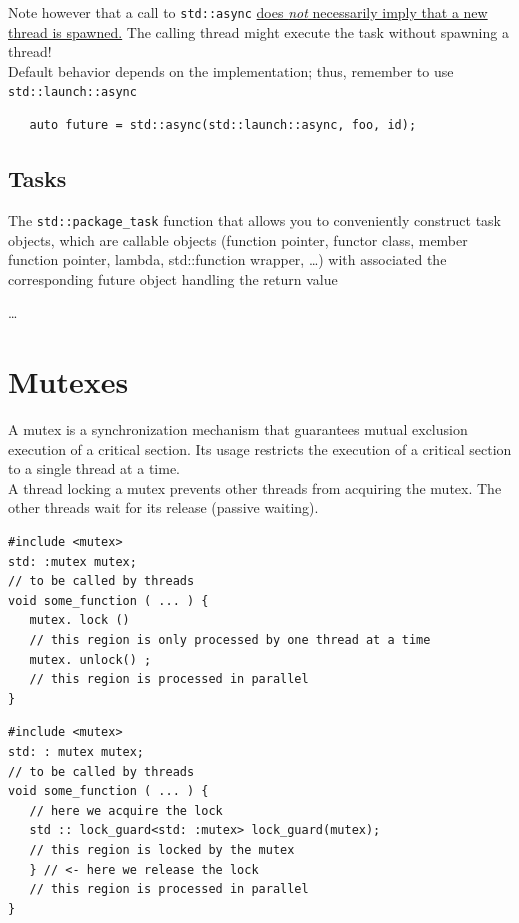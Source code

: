 Note however that a call to \lstinline|std::async| \ul{does \textit{not} necessarily imply that a new thread is spawned.}
The calling thread might execute the task without spawning a thread!\\
Default behavior depends on the implementation; thus, remember to use \lstinline|std::launch::async|
\begin{lstlisting}
   auto future = std::async(std::launch::async, foo, id);
\end{lstlisting}

\subsection{Tasks}
The \lstinline|std::package_task| function that allows you to conveniently
construct task objects, which are callable objects (function pointer, functor class, member function pointer, lambda,
std::function wrapper, …) with associated the corresponding future object handling the return value

\dots


\section{Mutexes}
A mutex is a synchronization mechanism that guarantees mutual exclusion execution of a critical
section. Its usage restricts the execution of a critical section to a single thread at a time.\\
A thread locking a mutex prevents other threads from acquiring the mutex. The other threads wait for
its release (passive waiting).

\begin{paracol}{2}
   
   \begin{lstlisting}
#include <mutex>
std: :mutex mutex;
// to be called by threads
void some_function ( ... ) {
   mutex. lock ()
   // this region is only processed by one thread at a time
   mutex. unlock() ;
   // this region is processed in parallel
}
   \end{lstlisting}

   \switchcolumn

   \begin{lstlisting}
#include <mutex>
std: : mutex mutex;
// to be called by threads
void some_function ( ... ) {
   // here we acquire the lock
   std :: lock_guard<std: :mutex> lock_guard(mutex);
   // this region is locked by the mutex
   } // <- here we release the lock
   // this region is processed in parallel
}
   \end{lstlisting}
\end{paracol}

